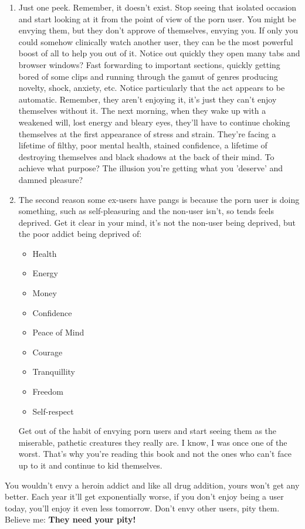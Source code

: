 \documentclass[easypeasy.tex]{subfiles}
\begin{document}
\begin{enumerate}
  \item Just one peek. Remember, it doesn't exist. Stop seeing that isolated occasion and start looking at it from the point of view of the porn user. You might be envying them, but they don't approve of themselves, envying you. If only you could somehow clinically watch another user, they can be the most powerful boost of all to help you out of it. Notice out quickly they open many tabs and browser windows? Fast forwarding to important sections, quickly getting bored of some clips and running through the gamut of genres producing novelty, shock, anxiety, etc. Notice particularly that the act appears to be automatic. Remember, they aren't enjoying it, it's just they can't enjoy themselves without it. The next morning, when they wake up with a weakened will, lost energy and bleary eyes, they'll have to continue choking themselves at the first appearance of stress and strain. They're facing a lifetime of filthy, poor mental health, stained confidence, a lifetime of destroying themselves and black shadows at the back of their mind. To achieve what purpose? The illusion you're getting what you 'deserve' and damned pleasure?

  \item The second reason some ex-users have pangs is because the porn user is doing something, such as self-pleasuring and the non-user isn't, so tends feels deprived. Get it clear in your mind, it's not the non-user being deprived, but the poor addict being deprived of:
  \begin{itemize}
    \item Health
    \item Energy
    \item Money
    \item Confidence
    \item Peace of Mind
    \item Courage
    \item Tranquillity
    \item Freedom
    \item Self-respect
  \end{itemize}

  Get out of the habit of envying porn users and start seeing them as the miserable, pathetic creatures they really are. I know, I was once one of the worst. That's why you're reading this book and not the ones who can't face up to it and continue to kid themselves.
\end{enumerate}

  You wouldn't envy a heroin addict and like all drug addition, yours won't get any better. Each year it'll get exponentially worse, if you don't enjoy being a user today, you'll enjoy it even less tomorrow. Don't envy other users, pity them. Believe me: \textbf{They need your pity!}
\end{document}
